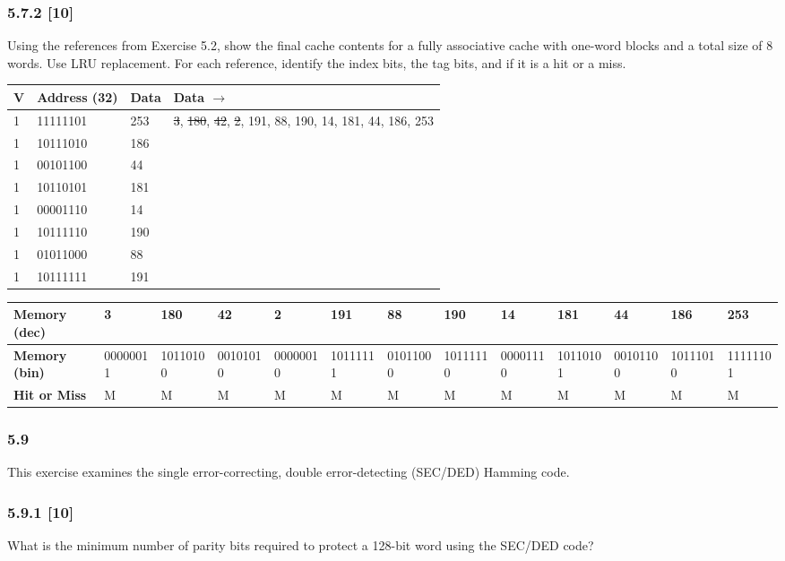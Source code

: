 \documentclass[fleqn]{article}
\begin{document}
\subsubsection*{5.7.2 [10] \textrangle} Using the references from Exercise 5.2, show the final cache contents for a fully associative cache with one-word blocks and a total size of 8 words. Use LRU replacement. For each reference, identify the index bits, the tag bits, and if it is a hit or a miss.
\begin{table}[H]
    \setlength{\tabcolsep}{3pt}
    \fontsize{6pt}{12pt}\selectfont
    \begin{tabular}{l|l|l||l}
    \textbf{V} & \textbf{Address (32)} & \textbf{Data} & \textbf{Data $\rightarrow$} \\ \hline
    1 & 11111101 & 253 &  \st{3}, \st{180}, \st{42}, \st{2}, 191, 88, 190, 14, 181, 44, 186, 253 \\
    1 & 10111010 & 186 & \\
    1 & 00101100 & 44 & \\
    1 & 10110101 & 181 &  \\
    1 & 00001110 & 14 & \\
    1 & 10111110 & 190 & \\
    1 & 01011000 & 88 & \\
    1 & 10111111 & 191 & 
    \end{tabular}
\end{table}

\begin{table}[H]
    \setlength{\tabcolsep}{3pt}
    \fontsize{6pt}{12pt}\selectfont
    \begin{tabular}{l|l|l|l|l|l|l|l|l|l|l|l|l}
    \textbf{Memory (dec)} & \textbf{3} & \textbf{180} & \textbf{42} & \textbf{2} & \textbf{191} & \textbf{88} & \textbf{190} & \textbf{14} & \textbf{181} & \textbf{44} & \textbf{186} & \textbf{253} \\ \hline
    \textbf{Memory (bin)} & 00000011 & 10110100 & 00101010 & 00000010 & 10111111 & 01011000 & 10111110 & 00001110 & 10110101 & 00101100 & 10111010 & 11111101 \\
    \textbf{Hit or Miss} & M & M & M & M & M & M & M & M & M & M & M & M \\
    \end{tabular}
\end{table}

\subsubsection*{5.9} This exercise examines the single error-correcting, double error-detecting (SEC/DED) Hamming code.
\subsubsection*{5.9.1 [10] \textrangle} What is the minimum number of parity bits required to protect a 128-bit word using the SEC/DED code?
\end{document}
